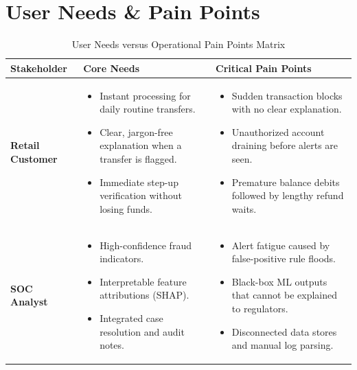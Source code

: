 \section{User Needs \& Pain Points}
\begin{table}[h]
\centering
\caption{User Needs versus Operational Pain Points Matrix}
\label{tab:user_needs_pain_points}
\begin{tabularx}{\textwidth}{lXX}
\toprule
\textbf{Stakeholder} & \textbf{Core Needs} & \textbf{Critical Pain Points} \\
\midrule
\textbf{Retail Customer} & 
\begin{itemize}[leftmargin=*, nosep]
    \item Instant processing for daily routine transfers.
    \item Clear, jargon-free explanation when a transfer is flagged.
    \item Immediate step-up verification without losing funds.
\end{itemize} & 
\begin{itemize}[leftmargin=*, nosep]
    \item Sudden transaction blocks with no clear explanation.
    \item Unauthorized account draining before alerts are seen.
    \item Premature balance debits followed by lengthy refund waits.
\end{itemize} \\
\addlinespace
\textbf{SOC Analyst} & 
\begin{itemize}[leftmargin=*, nosep]
    \item High-confidence fraud indicators.
    \item Interpretable feature attributions (SHAP).
    \item Integrated case resolution and audit notes.
\end{itemize} & 
\begin{itemize}[leftmargin=*, nosep]
    \item Alert fatigue caused by false-positive rule floods.
    \item Black-box ML outputs that cannot be explained to regulators.
    \item Disconnected data stores and manual log parsing.
\end{itemize} \\
\bottomrule
\end{tabularx}
\end{table}


